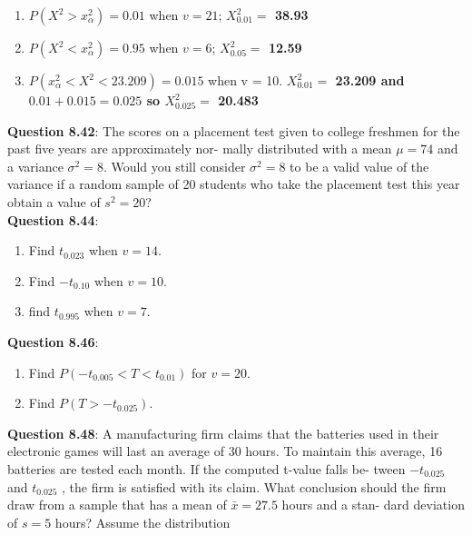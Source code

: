 \documentclass{article}
\begin{document}
        \begin{enumerate}[label = (\alph*) ]
            \item $P(X^2 > x^{2}_{\alpha}) = 0.01$ when $v = 21$;\newline
                \textbf{$X_{0.01}^{2} = $ 38.93}
            \item $P(X^2 < x^{2}_{\alpha}) = 0.95$ when $v = 6$;\newline
                \textbf{$X_{0.05}^{2} = $ 12.59}
            \item $P(x^{2}_{\alpha} < X^2 < 23.209) = 0.015$ when v = 10.\newline
                \textbf{$X_{0.01}^{2}= $ 23.209 and $0.01 + 0.015 = 0.025$ so $X_{0.025}^{2}= $ 20.483}
        \end{enumerate}
    \textbf{Question 8.42}: The scores on a placement test given to college
    freshmen for the past five years are approximately nor-
    mally distributed with a mean $\mu = 74$ and a variance
    $\sigma^2 = 8$. Would you still consider $\sigma^2 = 8$ to be a valid
    value of the variance if a random sample of 20 students
    who take the placement test this year obtain a value of
    $s^2 = 20$?\\\newline
    \textbf{Question 8.44}:
        \begin{enumerate}[label = (\alph*) ]
            \item Find $t_{0.023}$ when $v = 14$.
            \item Find $-t_{0.10}$ when $v = 10$.
            \item find $t_0.995$ when $v = 7$.
        \end{enumerate}
    \textbf{Question 8.46}:
        \begin{enumerate}[label = (\alph*) ]
            \item Find $P(-t_{0.005} < T < t_{0.01})$ for $v = 20$.
            \item Find $P(T > -t_{0.025})$.
        \end{enumerate}
    \textbf{Question 8.48}: A manufacturing firm claims that the batteries
    used in their electronic games will last an average of
    30 hours. To maintain this average, 16 batteries are
    tested each month. If the computed t-value falls be-
    tween $-t_{0.025}$ and $t_{0.025}$ , the firm is satisfied with its
    claim. What conclusion should the firm draw from a
    sample that has a mean of $\bar{x} = 27.5$ hours and a stan-
    dard deviation of $s = 5$ hours? Assume the distribution
\end{document}
